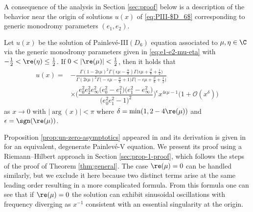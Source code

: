 A consequence of the analysis in Section \ref{sec:proof} below is a description of the behavior near the origin of solutions $u(x)$ of \eqref{eq:PIII-$D_6$} corresponding to generic monodromy parameters $(e_1, e_2)$.
\begin{prop}
\label{prop:un-zero-asymptotics}
 Let $u(x)$ be the solution of Painlev\'e-{\rm III}$(D_6)$ equation associated to $\mu, \eta \in \C$ via the generic monodromy parameters given in \eqref{eq:e1-e2-mu-eta} with $-\frac{1}{2}<\re(\eta)\leq\frac{1}{2}$. If $0<|{\re}(\mu)|<\frac{1}{2}$, then it holds that
 \begin{align}
 u(x) ={}& -\frac{ \Gamma (1 - 2\epsilon \mu)^2 \Gamma \left( \epsilon\mu -\frac{\alpha}{8}\right) \Gamma \big( \epsilon \mu+\frac{\beta}{8} + \frac{1}{2} \big)}{\Gamma (2 \epsilon \mu )^2 \Gamma \bigl(-\epsilon \mu-\frac{\alpha}{8}+1\bigr) \Gamma \bigl( - \epsilon \mu +\frac{\beta}{8} + \frac{1}{2} \bigr)} \nonumber\\
 &\times \Bigg(\dfrac{e_{0}^2 e_2^2 e_{\infty}^2\big(e_{0}^2-e_{1}^2\big) \big(e_{1}^2-e_{\infty}^2\big)}{\big(e_{0}^2 e_{1}^2-1\big)^2}\Bigg)^\epsilon
 x^{4 \epsilon \mu - 1} \big(1 + \mathcal{O}(x^\delta) \big)
 \label{eq:u-0-leading}
 \end{align}
 as $x\to 0$ with $|{\arg}(x)|<\pi$ where $\delta=\min(1,2-4\re(\mu))$ and $\epsilon = \sgn (\re (\mu))$.
\end{prop}
Proposition \ref{prop:un-zero-asymptotics} appeared in \cite[Theorem 3.2]{Jimbo} and its derivation is given in \cite{Kitaev87} for an equivalent, degenerate Painlev\'e-V equation. We present its proof using a Riemann--Hilbert approach in Section \ref{sec:prop-1-proof}, which follows the steps of the proof of Theorem \ref{thm:general}. The case $\re(\mu) = 0$ can be handled similarly, but we exclude it here because two distinct terms arise at the same leading order resulting in a more complicated formula. From this formula one can see that if $\re(\mu)=0$ the solution can exhibit sinusoidal oscillations with frequency diverging as $x^{-1}$ consistent with an essential singularity at the origin.

